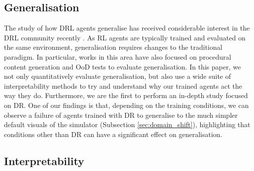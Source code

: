 \begin{table}
  \label{tbl:texture_expression}
  \centering
\caption{Python pseudocode describing the DR texture generators. rgb1 and rgb2 are random RGB colours; the value of each RGB channel is drawn uniformly from $\{0 \ldots 255\}$.}
\end{table}

\hypertarget{generalisation}{%
\subsection{Generalisation}\label{generalisation}}

The study of how DRL agents generalise has received considerable
interest in the DRL community recently
\cite{cobbe2018quantifying, justesen2018procedural, packer2018assessing, witty2018measuring, zhang2018dissection, zhao2019investigating}. As RL agents are typically trained and evaluated on the same environment, generalisation requires changes to the traditional paradigm. In particular, works in this area have also focused on procedural content generation and OoD tests to evaluate generalisation. In this paper, we not only quantitatively evaluate generalisation, but also use a wide suite of interpretability methods to try and understand why our trained agents act the way they do. Furthermore, we are the first to perform an in-depth study focused on DR. One of our findings is that, depending on the training conditions, we can observe a failure of agents trained with DR to generalise to the much simpler default visuals of the simulator (Subsection \ref{sec:domain_shift}), highlighting that conditions other than DR can have a significant effect on generalisation.

\hypertarget{interpretability}{%
\subsection{Interpretability}\label{interpretability}}

